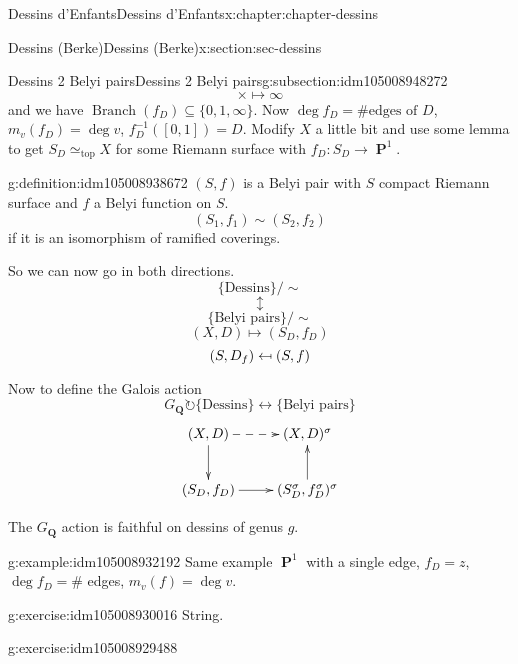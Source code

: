 \documentclass[oneside,10pt,]{book}
\numberwithin{equation}{section}
\newcommand{\lb}{[}
\newcommand{\rb}{]}
\providecommand\mapsfrom{\mathrel{\reflectbox{\ensuremath{\mapsto}}}}
\newcommand{\QQ}{\mathbf{Q}}
\newcommand{\acts}{\circlearrowright}
\DeclareMathOperator{\PP}{\mathbf{P}}
\begin{document}
\begin{chapterptx}{Dessins d'Enfants}{}{Dessins d'Enfants}{}{}{x:chapter:chapter-dessins}
\begin{sectionptx}{Dessins (Berke)}{}{Dessins (Berke)}{}{}{x:section:sec-dessins}
\begin{subsectionptx}{Dessins 2 Belyi pairs}{}{Dessins 2 Belyi pairs}{}{}{g:subsection:idm105008948272}
\begin{equation*}
\times \mapsto\infty
\end{equation*}
and we have \(\operatorname{Branch}(f_D) \subseteq \{0,1,\infty\}\). Now \(\deg f_D = \#\text{edges of }D\), \(m_v(f_D) = \deg v\), \(f_D^{-1}(\lb 0 , 1 \rb) = D\). Modify \(X\) a little bit and use some lemma to get \(S_D \simeq_{\text{top}} X\) for some Riemann surface with \(f_D\colon S_D \to \PP^1\).%
\begin{definition}{}{g:definition:idm105008938672}%
\((S,f)\) is a Belyi pair with \(S\) compact Riemann surface and  \(f\) a Belyi function on \(S\).%
\begin{equation*}
(S_1,f_1) \sim (S_2, f_2)
\end{equation*}
if it is an isomorphism of ramified coverings.%
\end{definition}
So we can now go in both directions.%
\begin{equation*}
\{\text{Dessins}\}/\sim
\end{equation*}
%
\begin{equation*}
\updownarrow
\end{equation*}
%
\begin{equation*}
\{\text{Belyi pairs}\}/\sim
\end{equation*}
%
\begin{equation*}
(X,D) \mapsto (S_D, f_D)
\end{equation*}
%
\begin{equation*}
(S, D_f) \mapsfrom (S,f)
\end{equation*}
%
\par
Now to define the Galois action%
\begin{equation*}
G_\QQ\acts \{\text{Dessins}\}\leftrightarrow \{\text{Belyi pairs}\}
\end{equation*}
%
\begin{equation*}
\xymatrix{
(X,D)\ar[d] \ar@{-->}[r] & (X,D)^\sigma \\
(S_D,f_D)\ar[r] & (S_D^\sigma,f_D^\sigma)^\sigma \ar[u]
}
\end{equation*}
%
\par
The \(G_\QQ\) action is faithful on dessins of genus \(g\).%
\begin{example}{}{g:example:idm105008932192}%
Same example \(\PP^1\) with a single edge, \(f_D  = z\), \(\deg f_D = \#\) edges, \(m_v(f)=  \deg v\).%
\end{example}
\begin{inlineexercise}{}{g:exercise:idm105008930016}%
String.%
\end{inlineexercise}
\begin{inlineexercise}{}{g:exercise:idm105008929488}%

\end{inlineexercise}
\end{subsectionptx}
\end{sectionptx}
\end{chapterptx}
\end{document}
